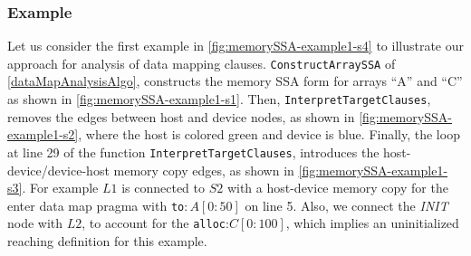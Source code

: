 \subsubsection{Example }
Let us consider the first example in \autoref{fig:memorySSA-example1-s4}
to illustrate our approach for analysis of data mapping clauses.
\texttt{ConstructArraySSA} of \autoref{dataMapAnalysisAlgo},  
constructs the memory SSA form for arrays ``A'' and ``C'' as shown in \autoref{fig:memorySSA-example1-s1}.
Then, \texttt{InterpretTargetClauses}, removes 
the edges between host and device nodes, as shown in 
\autoref{fig:memorySSA-example1-s2}, where the host is 
colored green and device is blue.
Finally, the loop at line 29 of the function \texttt{InterpretTargetClauses}, 
introduces the host-device/device-host 
memory copy edges, as shown in 
\autoref{fig:memorySSA-example1-s3}. For example
$L1$ is connected to $S2$
with a host-device memory copy for the enter data map 
pragma with \texttt{to}$:A[0:50]$ on line 5. 
Also, we connect the \textit{INIT} node with $L2$, 
to account for the \texttt{alloc}:$C[0:100]$, which implies 
an uninitialized reaching definition for this example. 

